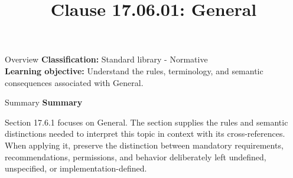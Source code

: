\documentclass[10pt,letterpaper]{article}
\title{Clause 17.06.01: General}
\author{}
\date{}
\begin{document}
\maketitle
\begin{CornellOverviewBox}{Overview}
\textbf{Classification:} Standard library - Normative\\[2pt]
\textbf{Learning objective:} Understand the rules, terminology, and semantic consequences associated with General.
\end{CornellOverviewBox}\begin{CornellSummaryBox}{Summary}
{\sffamily\bfseries\color{Accent} Summary}\par\vspace{3pt}Section 17.6.1 focuses on General. The section supplies the rules and semantic distinctions needed to interpret this topic in context with its cross-references. When applying it, preserve the distinction between mandatory requirements, recommendations, permissions, and behavior deliberately left undefined, unspecified, or implementation-defined.
\end{CornellSummaryBox}
\end{document}
